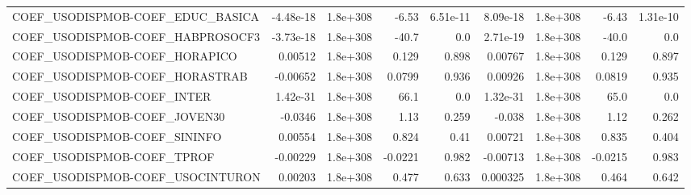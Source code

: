 \begin{tabular}{lrrrrrrrr}
COEF\_USODISPMOB-COEF\_EDUC\_BASICA  &   -4.48e-18 &     1.8e+308 &     -6.53 & 6.51e-11 &   8.09e-18 &    1.8e+308 &        -6.43 &      1.31e-10 \\
COEF\_USODISPMOB-COEF\_HABPROSOCF3  &   -3.73e-18 &     1.8e+308 &     -40.7 &      0.0 &   2.71e-19 &    1.8e+308 &        -40.0 &           0.0 \\
COEF\_USODISPMOB-COEF\_HORAPICO     &     0.00512 &     1.8e+308 &     0.129 &    0.898 &    0.00767 &    1.8e+308 &        0.129 &         0.897 \\
COEF\_USODISPMOB-COEF\_HORASTRAB    &    -0.00652 &     1.8e+308 &    0.0799 &    0.936 &    0.00926 &    1.8e+308 &       0.0819 &         0.935 \\
COEF\_USODISPMOB-COEF\_INTER        &    1.42e-31 &     1.8e+308 &      66.1 &      0.0 &   1.32e-31 &    1.8e+308 &         65.0 &           0.0 \\
COEF\_USODISPMOB-COEF\_JOVEN30      &     -0.0346 &     1.8e+308 &      1.13 &    0.259 &     -0.038 &    1.8e+308 &         1.12 &         0.262 \\
COEF\_USODISPMOB-COEF\_SININFO      &     0.00554 &     1.8e+308 &     0.824 &     0.41 &    0.00721 &    1.8e+308 &        0.835 &         0.404 \\
COEF\_USODISPMOB-COEF\_TPROF        &    -0.00229 &     1.8e+308 &   -0.0221 &    0.982 &   -0.00713 &    1.8e+308 &      -0.0215 &         0.983 \\
COEF\_USODISPMOB-COEF\_USOCINTURON  &     0.00203 &     1.8e+308 &     0.477 &    0.633 &   0.000325 &    1.8e+308 &        0.464 &         0.642 \\
\bottomrule
\end{tabular}
